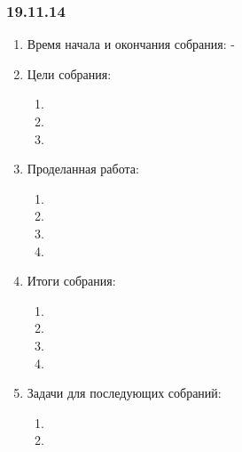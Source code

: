 \subsubsection{19.11.14}

\begin{enumerate}
	\item Время начала и окончания собрания:
	-
	\item Цели собрания:
	\begin{enumerate}
	  \item 
	  
	  \item 
	  
	  \item 
	  
    \end{enumerate}
	\item Проделанная работа:
	\begin{enumerate}
	  \item
      
      \item  
      
      \item  
      
      \item   
          
    \end{enumerate}
    
	\item Итоги собрания: 
	\begin{enumerate}
	  \item 
	  
      \item 
      
      \item 
      
      \item 
      
    \end{enumerate}
    
	\item Задачи для последующих собраний:
	\begin{enumerate}
	  \item 
	  
	  \item 

    \end{enumerate}     
\end{enumerate}
\fillpage